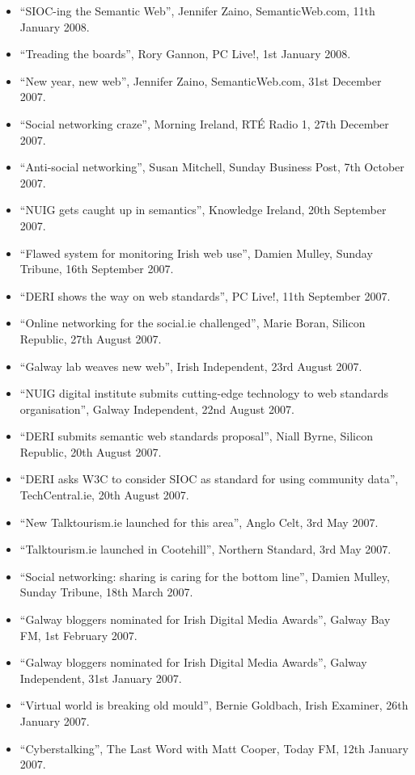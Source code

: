 \documentclass[10pt,a4paper]{res} %
\begin{document}
\begin{resume}
{\begin{itemize}
\item ``SIOC-ing the Semantic Web'', Jennifer Zaino, SemanticWeb.com, 11th January 2008.
\item ``Treading the boards'', Rory Gannon, PC Live!, 1st January 2008.
\item ``New year, new web'', Jennifer Zaino, SemanticWeb.com, 31st December 2007.
\item ``Social networking craze'', Morning Ireland, RT\'{E} Radio 1, 27th December 2007.
\item ``Anti-social networking'', Susan Mitchell, Sunday Business Post, 7th October 2007.
\item ``NUIG gets caught up in semantics'', Knowledge Ireland, 20th September 2007.
\item ``Flawed system for monitoring Irish web use'', Damien Mulley, Sunday Tribune, 16th September 2007.
\item ``DERI shows the way on web standards'', PC Live!, 11th September 2007.
\item ``Online networking for the social.ie challenged'', Marie Boran, Silicon Republic, 27th August 2007.
\item ``Galway lab weaves new web'', Irish Independent, 23rd August 2007.
\item ``NUIG digital institute submits cutting-edge technology to web standards organisation'', Galway Independent, 22nd August 2007.
\item ``DERI submits semantic web standards proposal'', Niall Byrne, Silicon Republic, 20th August 2007.
\item ``DERI asks W3C to consider SIOC as standard for using community data'', TechCentral.ie, 20th August 2007.
\item ``New Talktourism.ie launched for this area'', Anglo Celt, 3rd May 2007.
\item ``Talktourism.ie launched in Cootehill'', Northern Standard, 3rd May 2007.
\item ``Social networking: sharing is caring for the bottom line'', Damien Mulley, Sunday Tribune, 18th March 2007.
\item ``Galway bloggers nominated for Irish Digital Media Awards'', Galway Bay FM, 1st February 2007.
\item ``Galway bloggers nominated for Irish Digital Media Awards'', Galway Independent, 31st January 2007.
\item ``Virtual world is breaking old mould'', Bernie Goldbach, Irish Examiner, 26th January 2007.
\item ``Cyberstalking'', The Last Word with Matt Cooper, Today FM, 12th January 2007.

\end{itemize}}
\end{resume}
\end{document}
